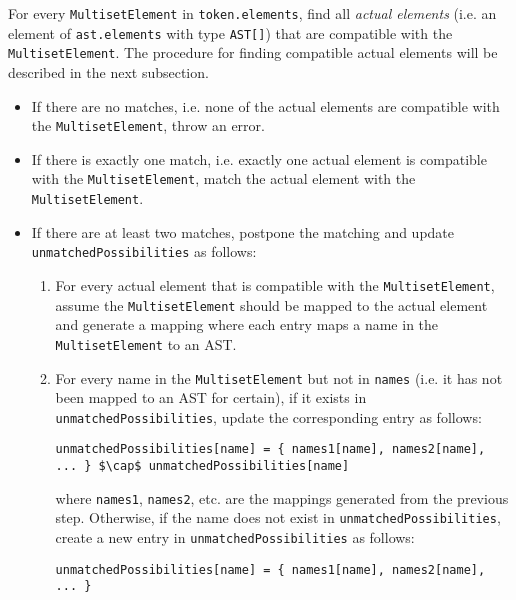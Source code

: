 For every \lstinline{MultisetElement} in \lstinline{token.elements}, find all \textit{actual elements} (i.e. an element of \lstinline{ast.elements} with type \lstinline{AST[]}) that are compatible with the \lstinline{MultisetElement}. The procedure for finding compatible actual elements will be described in the next subsection.
\begin{itemize}
    \item If there are no matches, i.e. none of the actual elements are compatible with the \lstinline{MultisetElement}, throw an error.
    \item If there is exactly one match, i.e. exactly one actual element is compatible with the \lstinline{MultisetElement}, match the actual element with the \lstinline{MultisetElement}.
    \item If there are at least two matches, postpone the matching and update \lstinline{unmatchedPossibilities} as follows:
    \begin{enumerate}
        \item For every actual element that is compatible with the \lstinline{MultisetElement}, assume the \lstinline{MultisetElement} should be mapped to the actual element and generate a mapping where each entry maps a name in the \lstinline{MultisetElement} to an AST.
        \item For every name in the \lstinline{MultisetElement} but not in \lstinline{names} (i.e. it has not been mapped to an AST for certain), if it exists in \lstinline{unmatchedPossibilities}, update the corresponding entry as follows:
        \begin{center}
            \lstinline|unmatchedPossibilities[name] = { names1[name], names2[name], ... } $\cap$ unmatchedPossibilities[name]|
        \end{center}
        where \lstinline{names1}, \lstinline{names2}, etc. are the mappings generated from the previous step. Otherwise, if the name does not exist in \lstinline{unmatchedPossibilities}, create a new entry in \lstinline{unmatchedPossibilities} as follows:
        \begin{center}
            \lstinline|unmatchedPossibilities[name] = { names1[name], names2[name], ... }|
        \end{center}
    \end{enumerate}
\end{itemize}

